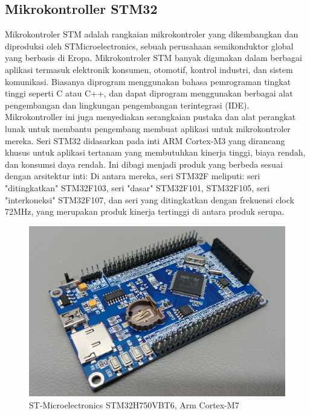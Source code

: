 \subsection{Mikrokontroller STM32}
Mikrokontroler STM adalah rangkaian mikrokontroler yang dikembangkan dan diproduksi oleh STMicroelectronics, sebuah perusahaan semikonduktor global yang berbasis di Eropa. 
Mikrokontroler STM banyak digunakan dalam berbagai aplikasi termasuk elektronik konsumen, otomotif, kontrol industri, dan sistem komunikasi. Biasanya diprogram menggunakan 
bahasa pemrograman tingkat tinggi seperti C atau C++, dan dapat diprogram menggunakan berbagai alat pengembangan dan lingkungan pengembangan terintegrasi (IDE). 
Mikrokontroller ini juga menyediakan serangkaian pustaka dan alat perangkat lunak untuk membantu pengembang membuat aplikasi untuk mikrokontroler mereka. Seri STM32 didasarkan pada inti ARM Cortex-M3 yang dirancang khusus untuk aplikasi tertanam yang membutuhkan kinerja tinggi, biaya rendah, dan konsumsi daya rendah. Ini dibagi menjadi 
produk yang berbeda sesuai dengan arsitektur inti: Di antara mereka, seri STM32F meliputi: seri "ditingkatkan" STM32F103, seri "dasar" STM32F101, STM32F105, seri "interkoneksi" STM32F107, 
dan seri yang ditingkatkan dengan frekuensi clock 72MHz, yang merupakan produk kinerja tertinggi di antara produk serupa. 

\begin{figure} [ht] \centering
  \includegraphics[scale=0.35]{gambar/STM32H750VBT6_Generic_Development_Board.jpg}
  \caption{ST-Microelectronics STM32H750VBT6, Arm Cortex-M7}
  \label{fig:STM-Board}
\end{figure}

